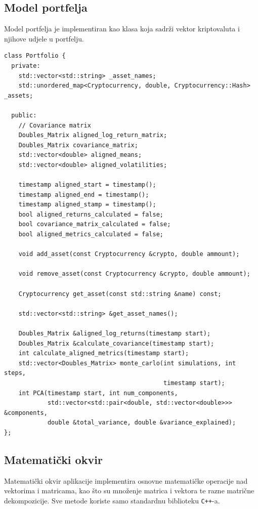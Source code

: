\documentclass[zavrsnirad, upload]{fer}
\begin{document}
\subsection{Model portfelja}
\label{sek:model_portfelja}
Model portfelja je implementiran kao klasa koja
sadrži vektor kriptovaluta i njihove udjele u portfelju.
\begin{lstlisting}[caption={Model portfelja}, label={lst:portfelj}]
class Portfolio {
  private:
    std::vector<std::string> _asset_names;
    std::unordered_map<Cryptocurrency, double, Cryptocurrency::Hash> _assets;

  public:
    // Covariance matrix
    Doubles_Matrix aligned_log_return_matrix;
    Doubles_Matrix covariance_matrix;
    std::vector<double> aligned_means;
    std::vector<double> aligned_volatilities;

    timestamp aligned_start = timestamp();
    timestamp aligned_end = timestamp();
    timestamp aligned_stamp = timestamp();
    bool aligned_returns_calculated = false;
    bool covariance_matrix_calculated = false;
    bool aligned_metrics_calculated = false;

    void add_asset(const Cryptocurrency &crypto, double ammount);

    void remove_asset(const Cryptocurrency &crypto, double ammount);

    Cryptocurrency get_asset(const std::string &name) const;

    std::vector<std::string> &get_asset_names();

    Doubles_Matrix &aligned_log_returns(timestamp start);
    Doubles_Matrix &calculate_covariance(timestamp start);
    int calculate_aligned_metrics(timestamp start);
    std::vector<Doubles_Matrix> monte_carlo(int simulations, int steps,
                                            timestamp start);
    int PCA(timestamp start, int num_components,
            std::vector<std::pair<double, std::vector<double>>> &components,
            double &total_variance, double &variance_explained);
};
\end{lstlisting}

\subsection{Matematički okvir}
\label{sek:matematicki_okvir}
Matematički okvir aplikacije implementira osnovne matematičke
operacije nad vektorima i matricama, kao što su množenje
matrica i vektora te razne matrične dekompozicije. Sve metode koriste
samo standardnu biblioteku \texttt{C++}-a.
\end{document}
